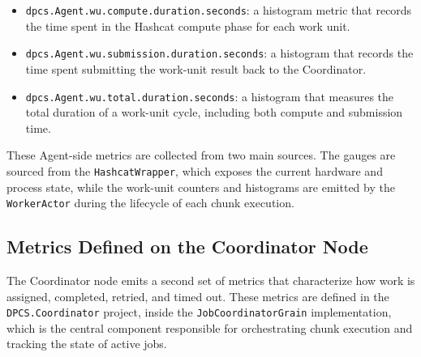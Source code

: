 \begin{itemize}
    \item \verb|dpcs.Agent.wu.compute.duration.seconds|: a histogram metric that records the time spent in the Hashcat compute phase for each work unit.

    \item \verb|dpcs.Agent.wu.submission.duration.seconds|: a histogram that records the time spent submitting the work-unit result back to the Coordinator.

    \item \verb|dpcs.Agent.wu.total.duration.seconds|: a histogram that measures the total duration of a work-unit cycle, including both compute and submission time.
\end{itemize}

These Agent-side metrics are collected from two main sources. The gauges are sourced from the \verb|HashcatWrapper|, which exposes the current hardware and process state, while the work-unit counters and histograms are emitted by the \verb|WorkerActor| during the lifecycle of each chunk execution.

\subsection{Metrics Defined on the Coordinator Node}

The Coordinator node emits a second set of metrics that characterize how work is assigned, completed, retried, and timed out. These metrics are defined in the \verb|DPCS.Coordinator| project, inside the \verb|JobCoordinatorGrain| implementation, which is the central component responsible for orchestrating chunk execution and tracking the state of active jobs.

